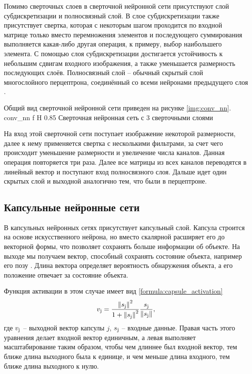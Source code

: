 Помимо сверточных слоев в сверточной нейронной сети присутствуют слой субдискретизации и полносвязный слой. В слое субдискретизации также присутствует свертка, которая с некоторым шагом проходится по входной матрице только вместо перемножения элементов и последующего суммирования выполняется какая-либо другая операция, к примеру, выбор наибольшего элемента. С помощью слоя субдискретизации достигается устойчивость к небольшим сдвигам входного изображения, а также
уменьшается размерность последующих слоёв. Полносвязный слой -- обычный скрытый слой многослойного перцептрона, соединённый со всеми нейронами предыдущего слоя \cite{svertka}.

Общий вид сверточной нейронной сети приведен на рисунке \ref{img:conv_nn}.
{conv_nn} %
{f} %
{H} %
{0.85\textwidth} %
{Сверточная нейронная сеть с 3 сверточными слоями} %

На вход этой сверточной сети поступает изображение некоторой размерности, далее к нему применяется свертка с несколькими фильтрами, за счет чего происходит уменьшение размерности и увеличение числа каналов. Данная операция повторяется три раза. Далее все матрицы из всех каналов переводятся в линейный вектор и поступают вход полносвязного слоя. Дальше идет один скрытых слой и выходной аналогично тем, что были в перцептроне.

\subsection{Капсульные нейронные сети}

В капсульных нейронных сетях присутствует капсульный слой. Капсула строится на основе искусственного нейрона, но вместо скалярной расширяет его до векторной формы, что позволяет сохранять больше информации об объекте. На выходе мы получаем вектор, способный сохранять состояние объекта, например его позу \cite{capsule2}. Длина вектора определяет вероятность обнаружения объекта, а его положение отвечает за состояние объекта.

Функция активации в этом случае имеет вид \ref{formula:capsule_activation}
\begin{equation}\label{formula:capsule_activation}
v_{\rm{j}} = \frac{\left\| s_{\rm{j}} \right\|^2}{1 + \left\| s_{\rm{j}} \right\|^2} \frac{s_{\rm{j}}}{\left\| s_{\rm{j}} \right\|},
\end{equation}
где $v_{\rm{j}}$ -- выходной вектор капсулы $j$, $s_{\rm{j}}$ -- входные данные. Правая часть этого уравнения делает входной вектор единичным, а левая выполняет масштабирование таким образом, чтобы чем длиннее был входной вектор, тем ближе длина выходного была к единице, и чем меньше длина входного, тем ближе длина выходного к нулю.

